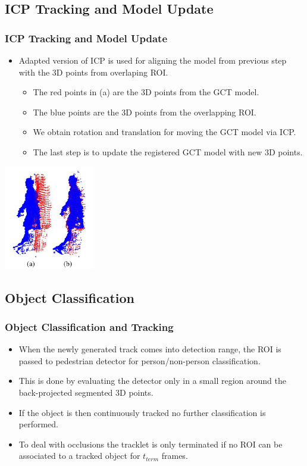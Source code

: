 \documentclass{beamer}
\begin{document}
\subsection{ICP Tracking and Model Update}
\begin{frame}
\frametitle{ICP Tracking and Model Update} 

\begin{itemize}
  \item Adapted version of ICP is used for aligning the model from previous step with the 3D points from overlaping ROI.
  \begin{itemize}
  \item The red points in (a) are the 3D points from the GCT model.
  \item The blue points are the 3D points from the overlapping ROI.
  \item We obtain rotation and translation for moving the GCT model via ICP.
  \item The last step is to update the registered GCT model with new 3D points.
\end{itemize}
\end{itemize}
\begin{center}
  \includegraphics[width=4cm]{registration.jpg}
\end{center}
\end{frame}

\subsection{Object Classification}
\begin{frame}
\frametitle{Object Classification and Tracking} 

\begin{itemize}
  \item When the newly generated track comes into detection range, the ROI is passed to pedestrian detector for person/non-person classification.
  \item This is done by evaluating the detector only in a small region around the back-projected segmented 3D points.
  \item If the object is then continuously tracked no further classification is performed. 
  \item To deal with occlusions the tracklet is only terminated if no ROI can be associated to a tracked object for $t_{term}$ frames.
\end{itemize}
\end{frame}
\end{document}
